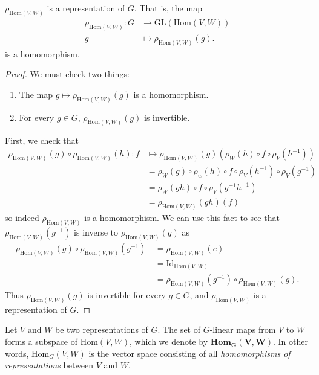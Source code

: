 \begin{prop} $\rho_{\text{Hom}(V,W)}$ is a representation of $G$.  That is, the map		
\begin{align*}		
  \rho_{\text{Hom}(V,W)} \colon G &\to \text{GL}(\text{Hom}(V,W)) \\		
g &\mapsto \rho_{\text{Hom}(V,W)}(g).		
\end{align*}		
 is a homomorphism.		
\end{prop}		
\begin{proof}		
We must check two things:		
\begin{enumerate}			
\item The map $g \mapsto  \rho_{\text{Hom}(V,W)}(g)$ is a homomorphism.	
\item For every $g \in G$,  $\rho_{\text{Hom}(V,W)}(g)$ is invertible.		
\end{enumerate}		
First, we check that
\begin{align*}
\rho_{\text{Hom}(V,W)}(g) \circ \rho_{\text{Hom}(V,W)}(h) \colon f &\mapsto \rho_{\text{Hom}(V,W)} (g) ( \rho_W (h) \circ f \circ \rho_V (h^ {-1})) \\
&= \rho_W (g) \circ \rho_w (h) \circ f \circ \rho_V (h^{-1} ) \circ \rho_V(g^{-1}) \\
&= \rho_W (gh) \circ f \circ \rho_V (g ^{-1} h ^{-1}) \\
&= \rho_{\text{Hom}(V,W)}(gh)(f)
\end{align*}
so indeed $\rho_{\text{Hom}(V,W)}$ is a homomorphism.  We can use this fact to see that $\rho_{\text{Hom}(V,W)}(g^{-1})$ is inverse to $\rho_{\text{Hom}(V,W)}(g)$ as
\begin{align*}
\rho_{\text{Hom}(V,W)}(g) \circ \rho_{\text{Hom}(V,W)}(g^{-1}) \ &= \rho_{\text{Hom}(V,W)} (e) \\ 
&= \text{Id}_{\text{Hom}(V,W)} \\
&= \rho_{\text{Hom}(V,W)}(g^{-1}) \circ \rho_{\text{Hom}(V,W)}(g).
\end{align*}
Thus $\rho_{\text{Hom}(V,W)}(g)$ is invertible for every $g \in G$, and $\rho_{\text{Hom}(V,W)}$ is a representation of $G$.
\end{proof}

\begin{defn}		
Let $V$ and $W$ be two representations of $G$.  The set of $G$-linear maps from $V$ to $W$ forms a subspace of $\text{Hom}(V,W)$, which we denote by $\textbf{Hom}_\mathbf{G}\mathbf{(V,W)}$.  In other words, $\text{Hom}_{G}(V,W)$ is the vector space consisting of all \textit{homomorphisms of representations} between $V$ and $W$. 
\end{defn} 

